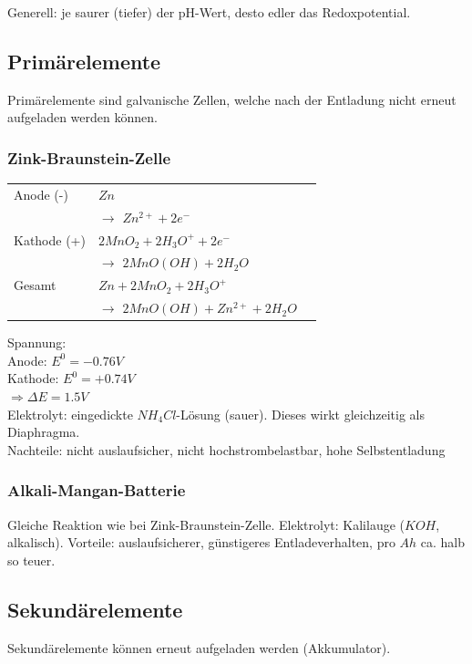 Generell: je saurer (tiefer) der pH-Wert, desto edler das Redoxpotential. \\

\subsection{Primärelemente}
Primärelemente sind galvanische Zellen, welche nach der Entladung nicht erneut aufgeladen werden können.

\subsubsection{Zink-Braunstein-Zelle}
\begin{table}[htbp]
	\begin{tabular}{lll}
	Anode (-) & $Zn$ \\ &\quad  $\rightarrow$ $Zn^{2+} + 2 e^-$ \\
	Kathode (+) & $2 MnO_2 + 2 H_3O^+ + 2e^-$ \\ &\quad $\rightarrow$ $2 MnO(OH) + 2 H_2O$  \\ \hline
	Gesamt & $Zn + 2 MnO_2 + 2 H_3O^+$ \\ &\quad $\rightarrow$ $2 MnO(OH) + Zn^{2+} + 2 H_2O$
	\end{tabular} 
\end{table}


Spannung: \\
Anode: $E^0 = -0.76V$ \\
Kathode: $E^0 = +0.74V$ \\
$\Rightarrow \Delta E = 1.5V$\\

Elektrolyt: eingedickte $NH_4Cl$-Lösung (sauer). Dieses wirkt gleichzeitig als Diaphragma.\\

Nachteile: nicht auslaufsicher, nicht hochstrombelastbar, hohe Selbstentladung \\

\subsubsection{Alkali-Mangan-Batterie}
Gleiche Reaktion wie bei Zink-Braunstein-Zelle. Elektrolyt: Kalilauge ($KOH
$, alkalisch). Vorteile: auslaufsicherer, günstigeres Entladeverhalten, pro $Ah$ ca. halb so teuer.

\subsection{Sekundärelemente}
Sekundärelemente können erneut aufgeladen werden (Akkumulator).

